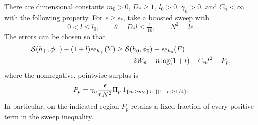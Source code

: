 \begin{lemma}\label{lem:entropy-increment}
There are dimensional constants \(m_0>0\), \(D_*\geq1\), \(l_0>0\),
\(\gamma_n>0\), and \(C_n<\infty\) with the following property.
For \(\epsilon\geq\epsilon_*\), take a boosted sweep with
\[
 0<l\leq l_0,\qquad \theta=D_*l\leq\tfrac1{16},
 \qquad N^2=l\epsilon.
\]
The errors can be chosen so that
\begin{equation}\label{eq:entropy-increment}
\begin{split}
 \mathcal S(h_+,\phi_+)-(1+l)\epsilon e_{h_+}(Y)
 \geq{}&\mathcal S(h_0,\phi_0)-\epsilon e_{h_0}(F)\\
 &+2W_p-n\log(1+l)-C_nl^2+P_p ,
\end{split}
\end{equation}
where the nonnegative, pointwise surplus is
\begin{equation}\label{eq:entropy-surplus-definition}
 P_p=\gamma_n\frac{\epsilon}{rN^2}\Pi_p\,
 \mathbf 1_{\{m\geq m_0\}\,\cup\,\{|1-r|\geq1/4\}}.
\end{equation}
In particular, on the indicated region \(P_p\) retains a fixed fraction
of every positive term in the sweep inequality.
\end{lemma}

